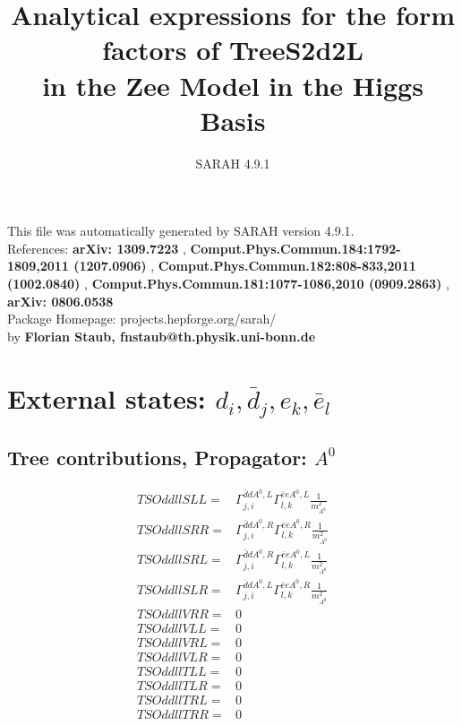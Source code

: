 \documentclass[A4,landscape]{article}
\begin{document}
\title{Analytical expressions for the form factors of TreeS2d2L\\ in the Zee Model in the Higgs Basis } 
 \author{SARAH 4.9.1} 
 \maketitle 
 \vspace{10cm} 
This file was automatically generated by SARAH version 4.9.1.  \\ 
References: {\bf arXiv: 1309.7223 }, {\bf Comput.Phys.Commun.184:1792-1809,2011 (1207.0906) }, {\bf Comput.Phys.Commun.182:808-833,2011 (1002.0840) }, {\bf Comput.Phys.Commun.181:1077-1086,2010 (0909.2863) }, {\bf arXiv: 0806.0538 } \\ 
Package Homepage: projects.hepforge.org/sarah/ \\ 
by {\bf Florian Staub, fnstaub@th.physik.uni-bonn.de} 
 \pagebreak 
 \tableofcontents 
 \pagebreak 
\section{External states: ${d_{{i}}, \bar{d}_{{j}}, e_{{k}}, \bar{e}_{{l}}}$} 
\subsection{Tree contributions, Propagator: $A^0$} 

\begin{align} 
  TSOddllSLL= & \Gamma^{\bar{d}d A^0 ,L}_{j, i} \Gamma^{\bar{e}e A^0 ,L}_{l, k} \frac{1}{m^2_{A^0}} \\ 
  TSOddllSRR= & \Gamma^{\bar{d}d A^0 ,R}_{j, i} \Gamma^{\bar{e}e A^0 ,R}_{l, k} \frac{1}{m^2_{A^0}} \\ 
  TSOddllSRL= & \Gamma^{\bar{d}d A^0 ,R}_{j, i} \Gamma^{\bar{e}e A^0 ,L}_{l, k} \frac{1}{m^2_{A^0}} \\ 
  TSOddllSLR= & \Gamma^{\bar{d}d A^0 ,L}_{j, i} \Gamma^{\bar{e}e A^0 ,R}_{l, k} \frac{1}{m^2_{A^0}} \\ 
  TSOddllVRR= & 0 \\ 
  TSOddllVLL= & 0 \\ 
  TSOddllVRL= & 0 \\ 
  TSOddllVLR= & 0 \\ 
  TSOddllTLL= & 0 \\ 
  TSOddllTLR= & 0 \\ 
  TSOddllTRL= & 0 \\ 
  TSOddllTRR= & 0 \\ 
\end{align} 
\end{document}
